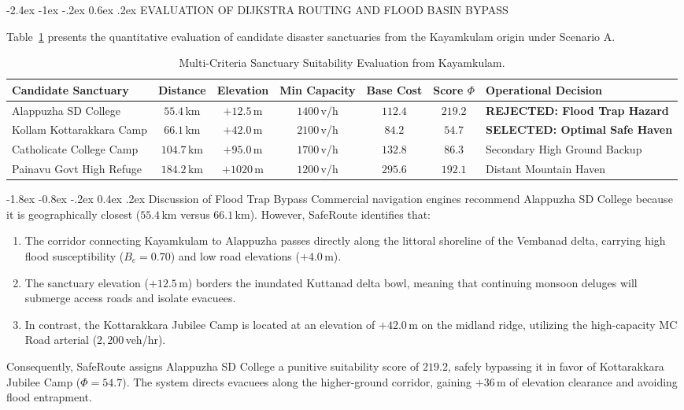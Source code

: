 \documentclass[12pt,oneside]{report}
\makeatletter
\renewcommand{\section}{\@startsection{section}{1}{\z@}%
  {-2.4ex \@plus -1ex \@minus -.2ex}%
  {0.6ex \@plus .2ex}%
  {\normalfont\large\bfseries}}
\renewcommand{\subsection}{\@startsection{subsection}{2}{\z@}%
  {-1.8ex \@plus -0.8ex \@minus -.2ex}%
  {0.4ex \@plus .2ex}%
  {\normalfont\normalsize\bfseries}}
\makeatother
\begin{document}
\section{EVALUATION OF DIJKSTRA ROUTING AND FLOOD BASIN BYPASS}

Table~\ref{tab:results_shelters} presents the quantitative evaluation of candidate disaster sanctuaries from the Kayamkulam origin under Scenario A.

\begin{table}[H]
\centering
\small
\caption{Multi-Criteria Sanctuary Suitability Evaluation from Kayamkulam.}
\label{tab:results_shelters}
\vspace{0.05in}
\begin{tabularx}{\textwidth}{lcccccX}
\toprule
\textbf{Candidate Sanctuary} & \textbf{Distance} & \textbf{Elevation} & \textbf{Min Capacity} & \textbf{Base Cost} & \textbf{Score $\Phi$} & \textbf{Operational Decision} \\
\midrule
Alappuzha SD College & $55.4$\,km & $+12.5$\,m & $1400$\,v/h & $112.4$ & $219.2$ & \textbf{REJECTED: Flood Trap Hazard} \\
Kollam Kottarakkara Camp & $66.1$\,km & $+42.0$\,m & $2100$\,v/h & $84.2$ & $\mathbf{54.7}$ & \textbf{SELECTED: Optimal Safe Haven} \\
Catholicate College Camp & $104.7$\,km & $+95.0$\,m & $1700$\,v/h & $132.8$ & $86.3$ & Secondary High Ground Backup \\
Painavu Govt High Refuge & $184.2$\,km & $+1020$\,m & $1200$\,v/h & $295.6$ & $192.1$ & Distant Mountain Haven \\
\bottomrule
\end{tabularx}
\end{table}

\subsection{Discussion of Flood Trap Bypass}
Commercial navigation engines recommend Alappuzha SD College because it is geographically closest ($55.4$\,km versus $66.1$\,km). However, SafeRoute identifies that:
\begin{enumerate}
    \item The corridor connecting Kayamkulam to Alappuzha passes directly along the littoral shoreline of the Vembanad delta, carrying high flood susceptibility ($B_e = 0.70$) and low road elevations ($+4.0$\,m).
    \item The sanctuary elevation ($+12.5$\,m) borders the inundated Kuttanad delta bowl, meaning that continuing monsoon deluges will submerge access roads and isolate evacuees.
    \item In contrast, the Kottarakkara Jubilee Camp is located at an elevation of $+42.0$\,m on the midland ridge, utilizing the high-capacity MC Road arterial ($2,200$\,veh/hr).
\end{enumerate}
Consequently, SafeRoute assigns Alappuzha SD College a punitive suitability score of $219.2$, safely bypassing it in favor of Kottarakkara Jubilee Camp ($\Phi = 54.7$). The system directs evacuees along the higher-ground corridor, gaining $+36$\,m of elevation clearance and avoiding flood entrapment.
\end{document}
